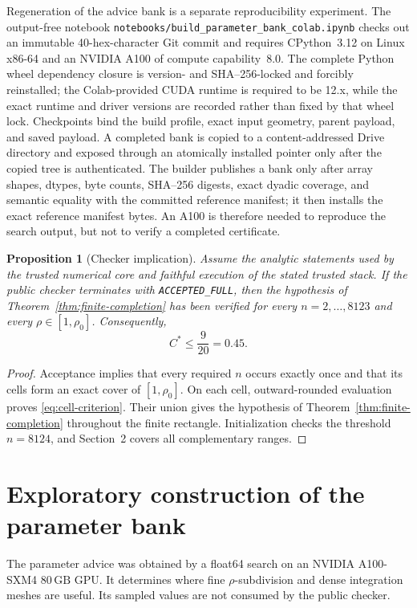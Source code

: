 \documentclass[11pt,a4paper,twoside]{article}
\newtheorem{proposition}[theorem]{Proposition}
\theoremstyle{remark}
\newcommand{\rhozero}{\rho_{0}}
\newcommand{\Cstar}{C^{\ast}}
\newcommand{\code}[1]{\texttt{#1}}
\begin{document}
Regeneration of the advice bank is a separate reproducibility experiment.
The output-free notebook
\code{notebooks/build\_parameter\_bank\_colab.ipynb} checks out an immutable
40-hex-character Git commit and requires CPython~3.12 on Linux x86-64 and an
NVIDIA A100 of compute capability~8.0.  The complete Python wheel dependency
closure is version- and SHA--256-locked and forcibly reinstalled; the
Colab-provided CUDA runtime is required to be 12.x, while the exact runtime and
driver versions are recorded rather than fixed by that wheel lock.  Checkpoints bind the build profile, exact
input geometry, parent payload, and saved payload.  A completed bank is copied
to a content-addressed Drive directory and exposed through an atomically
installed pointer only after the copied tree is authenticated.  The builder
publishes a bank only after array shapes, dtypes, byte counts, SHA--256 digests,
exact dyadic coverage, and semantic equality with the committed reference
manifest; it then installs the exact reference manifest bytes.  An A100 is therefore needed to
reproduce the search output, but not to verify a completed certificate.

\begin{proposition}[Checker implication]\label{prop:checker-implication}
Assume the analytic statements used by the trusted numerical core and
faithful execution of the stated trusted stack.  If the public checker
terminates with \code{ACCEPTED\_FULL}, then the hypothesis of
Theorem~\ref{thm:finite-completion} has been verified for every
\(n=2,\ldots,8123\) and every \(\rho\in[1,\rhozero]\).  Consequently,
\[
 \Cstar\le\frac9{20}=0.45.
\]
\end{proposition}

\begin{proof}
Acceptance implies that every required \(n\) occurs exactly once and that
its cells form an exact cover of \([1,\rhozero]\).  On each cell,
outward-rounded evaluation proves \eqref{eq:cell-criterion}.  Their union
gives the hypothesis of Theorem~\ref{thm:finite-completion} throughout the
finite rectangle.  Initialization checks the threshold \(n=8124\), and
Section~2 covers all complementary ranges.
\end{proof}

\section{Exploratory construction of the parameter bank}
\label{sec:exploration}

The parameter advice was obtained by a float64 search on an NVIDIA A100-SXM4
\(80\,\mathrm{GB}\) GPU.  It determines where fine \(\rho\)-subdivision and
dense integration meshes are useful.  Its sampled values are not consumed
by the public checker.
\end{document}
